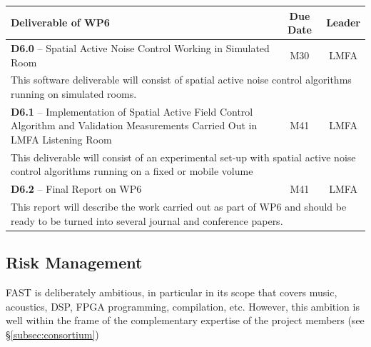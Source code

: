 \documentclass[a4paper,9pt]{extarticle}
\newcommand{\PP}{FAST}
\begin{document}
\begin{center}
\begin{tabular}{p{12cm} | c | c}
\textbf{Deliverable of WP6} & \textbf{Due Date} & \textbf{Leader}\\
\hline
\hline
\textbf{D6.0} -- Spatial Active Noise Control Working in Simulated Room & M30 & LMFA\\
\hline
\multicolumn{3}{p{16cm}}{This software deliverable will consist of spatial active noise control algorithms running on simulated rooms. }\\
\hline
\hline
\textbf{D6.1} -- Implementation of Spatial Active Field Control Algorithm and Validation Measurements Carried Out in LMFA Listening Room & M41 & LMFA\\
\hline
\multicolumn{3}{p{16cm}}{This deliverable will consist of an experimental set-up with spatial active noise control algorithms running on a fixed or mobile volume}\\
\hline
\hline
\textbf{D6.2} -- Final Report on WP6 & M41 & LMFA\\
\hline
\multicolumn{3}{p{16cm}}{This report will describe the work carried out as part of WP6 and should be ready to be turned into several journal and conference papers.}\\
\end{tabular}
\end{center}

\subsection{Risk Management}

\PP{} is deliberately ambitious, in particular in its scope that covers music, acoustics, DSP, FPGA programming, compilation, etc. However, this ambition is well within the frame of the complementary expertise of the project members (see \S\ref{subsec:consortium}) 
\end{document}
